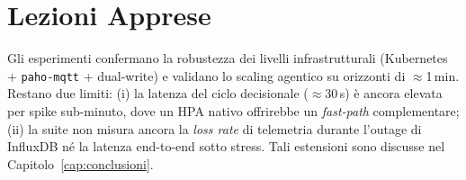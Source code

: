 \section{Lezioni Apprese}
\label{sec:lezioni_chaos}

Gli esperimenti confermano la robustezza dei livelli infrastrutturali (Kubernetes + \texttt{paho-mqtt} + dual-write) e validano lo scaling agentico su orizzonti di $\approx$1\,min. Restano due limiti: (i) la latenza del ciclo decisionale ($\approx$30\,s) è ancora elevata per spike sub-minuto, dove un HPA nativo offrirebbe un \emph{fast-path} complementare; (ii) la suite non misura ancora la \textit{loss rate} di telemetria durante l'outage di InfluxDB né la latenza end-to-end sotto stress. Tali estensioni sono discusse nel Capitolo~\ref{cap:conclusioni}.
